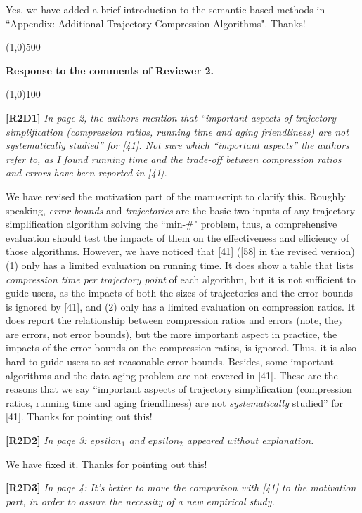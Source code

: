 \documentclass{letter}
\begin{document}
{{Yes, we have added a brief introduction to the semantic-based methods in ``Appendix: Additional Trajectory Compression Algorithms". Thanks!} 

\line(1,0){500}

\textbf{Response to the comments of Reviewer 2.}

\line(1,0){100}

\textbf{[R2D1]} \emph{In page 2, the authors mention that “important aspects of trajectory simplification (compression ratios, running time and aging friendliness) are not systematically studied” for [41]. Not sure which “important aspects” the authors refer to, as I found running time and the trade-off between compression ratios and errors have been reported in [41].}

We have revised the motivation part of the manuscript to clarify this.
Roughly speaking, \emph{error bounds} and \emph{trajectories} are the basic two inputs of any trajectory simplification algorithm solving the ``min-\#" problem, thus, a comprehensive evaluation should test the impacts of them on the effectiveness and efficiency of those algorithms.  
%
However, we have noticed that [41] ([58] in the revised version) (1) only has a limited evaluation on running time. It does show a table that lists \emph{compression time per trajectory point} of each algorithm, but it is not sufficient to guide users, as the impacts of both the sizes of trajectories and the error bounds is ignored by [41], and (2) only has a limited evaluation on compression ratios. It does report the relationship between compression ratios and errors (note, they are errors, not error bounds), but the more important aspect in practice, the impacts of the error bounds on the compression ratios, is ignored. Thus, it is also hard to guide users to set reasonable error bounds.
%
Besides, some important algorithms and the data aging problem are not covered in [41]. These are the reasons that we say ``important aspects of trajectory simplification (compression ratios, running time and aging friendliness) are not \emph{systematically} studied” for [41]. 
Thanks for pointing out this!

\textbf{[R2D2]} \emph{In page 3: $epsilon_1$ and $epsilon_2$ appeared without explanation.}

We have fixed it. Thanks for pointing out this!

\textbf{[R2D3]} \emph{ In page 4: It’s better to move the comparison with [41] to the motivation part, in order to assure the necessity of a new empirical study.}

}
\end{document}
